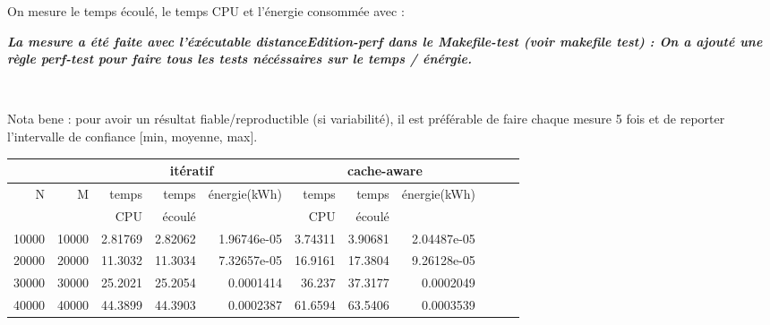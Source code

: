 \documentclass[10pt,a4paper]{article}
\begin{document}
On mesure le temps écoulé, le temps CPU et l'énergie consommée avec : \\ {\em
\textbf{La mesure a été faite avec l'éxécutable distanceEdition-perf dans le Makefile-test (voir makefile test) : On a ajouté une règle perf-test pour faire tous les
tests nécéssaires sur le temps / énérgie. }

\\

 }

Nota bene : pour avoir un résultat fiable/reproductible (si variabilité), 
il est préférable de faire chaque mesure 5 fois et de reporter l'intervalle
de confiance [min, moyenne, max].

\begin{tabular}{|r|r||r|r|r||r|r|r||r|r|r||}
\hline
 \multicolumn{2}{|c||}{ } 
& \multicolumn{3}{c||}{itératif}
& \multicolumn{3}{c||}{cache-aware}

\\ \hline
N & M 
& temps   & temps & énergie(kWh)      %
& temps   & temps & énergie(kWh)      %

\\
& 
& CPU     & écoulé&               %
& CPU     & écoulé&               %

\\ \hline
\hline
10000 & 10000 
& 2.81769 & 2.82062  & 1.96746e-05  %
& 3.74311 & 3.90681 & 2.04487e-05  %

\\ \hline
20000 & 20000 
& 11.3032 & 11.3034 & 7.32657e-05  %
& 16.9161 & 17.3804 & 9.26128e-05  %

\\ \hline
30000 & 30000 
& 25.2021 & 25.2054 & 0.0001414 %
& 36.237 & 37.3177 & 0.0002049  %
\\ \hline
40000 & 40000 
& 44.3899  & 44.3903  & 0.0002387  %
& 61.6594 & 63.5406 & 0.0003539 %
\\ \hline
\hline
\end{tabular}
\end{document}
